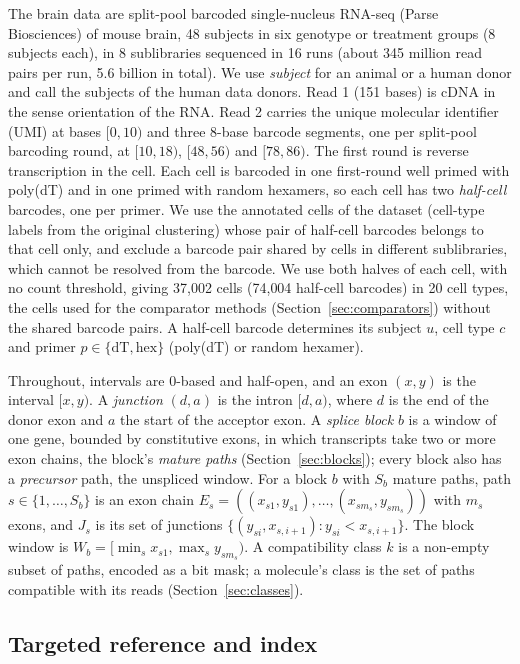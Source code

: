 \documentclass[11pt]{article}
\begin{document}
The brain data are split-pool barcoded single-nucleus RNA-seq (Parse Biosciences) of mouse brain, 48 subjects in six genotype or treatment groups (8 subjects each), in 8 sublibraries sequenced in 16 runs (about 345 million read pairs per run, 5.6 billion in total). We use \emph{subject} for an animal or a human donor and call the subjects of the human data donors. Read 1 (151 bases) is cDNA in the sense orientation of the RNA. Read 2 carries the unique molecular identifier (UMI) at bases $[0,10)$ and three 8-base barcode segments, one per split-pool barcoding round, at $[10,18)$, $[48,56)$ and $[78,86)$. The first round is reverse transcription in the cell. Each cell is barcoded in one first-round well primed with poly(dT) and in one primed with random hexamers, so each cell has two \emph{half-cell} barcodes, one per primer. We use the annotated cells of the dataset (cell-type labels from the original clustering) whose pair of half-cell barcodes belongs to that cell only, and exclude a barcode pair shared by cells in different sublibraries, which cannot be resolved from the barcode. We use both halves of each cell, with no count threshold, giving 37{,}002 cells (74{,}004 half-cell barcodes) in 20 cell types, the cells used for the comparator methods (Section~\ref{sec:comparators}) without the shared barcode pairs. A half-cell barcode determines its subject $u$, cell type $c$ and primer $p\in\{\mathrm{dT},\mathrm{hex}\}$ (poly(dT) or random hexamer).

Throughout, intervals are 0-based and half-open, and an exon $(x,y)$ is the interval $[x,y)$. A \emph{junction} $(d,a)$ is the intron $[d,a)$, where $d$ is the end of the donor exon and $a$ the start of the acceptor exon. A \emph{splice block} $b$ is a window of one gene, bounded by constitutive exons, in which transcripts take two or more exon chains, the block's \emph{mature paths} (Section~\ref{sec:blocks}); every block also has a \emph{precursor} path, the unspliced window. For a block $b$ with $S_b$ mature paths, path $s\in\{1,\ldots,S_b\}$ is an exon chain $E_s=((x_{s1},y_{s1}),\ldots,(x_{sm_s},y_{sm_s}))$ with $m_s$ exons, and $J_s$ is its set of junctions $\{(y_{si},x_{s,i+1}):y_{si}<x_{s,i+1}\}$. The block window is $W_b=[\min_s x_{s1},\max_s y_{sm_s})$. A compatibility class $k$ is a non-empty subset of paths, encoded as a bit mask; a molecule's class is the set of paths compatible with its reads (Section~\ref{sec:classes}).

\subsection{Targeted reference and index}
\end{document}
